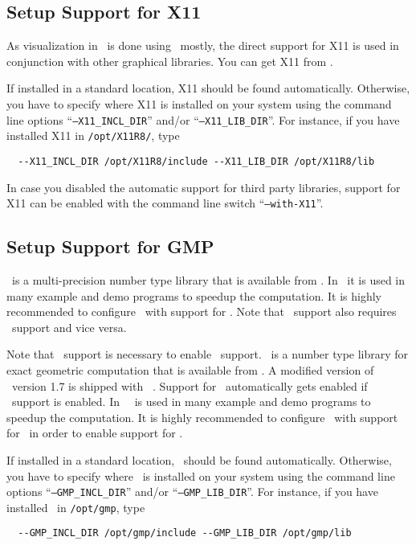 \subsection{Setup Support for X11\label{sec:x11-setup}}

As visualization in \cgal\ is done using \qt\ mostly, the direct
support for X11 is used in conjunction with other graphical libraries.
You can get X11 from \xpage.

If installed in a standard location, X11 should be found
automatically. Otherwise, you have to specify where X11 is installed
on your system using the command line options
``\texttt{--X11\_INCL\_DIR}'' and/or ``\texttt{--X11\_LIB\_DIR}''. For
instance, if you have installed X11 in \texttt{/opt/X11R8/}, type
\begin{verbatim}
  --X11_INCL_DIR /opt/X11R8/include --X11_LIB_DIR /opt/X11R8/lib
\end{verbatim}

In case you disabled the automatic support for third party libraries,
support for X11 can be enabled with the command line switch
``\texttt{--with-X11}''.

\subsection{Setup Support for GMP\label{sec:gmp-setup}}

\gmp\ is a multi-precision number type library that is available from
\gmppage. In \cgal\ it is used in many example and demo programs to
speedup the computation. It is highly recommended to configure \cgal\
with support for \gmp. Note that \gmp\ support also requires \mpfr\
support and vice versa.

Note that \gmp\ support is necessary to enable \core\ support.
\core\ is a number type library for exact geometric computation that
is available from \corepage. A modified version of \core\ version 1.7
is shipped with \cgal~\cgalrelease. Support for \core\ automatically
gets enabled if \gmp\ support is enabled. In \cgal\, \core\ is used
in many example and demo programs to speedup the computation. It is
highly recommended to configure \cgal\ with support for \gmp\ in order
to enable support for \core.

If installed in a standard location, \gmp\ should be
found automatically. Otherwise, you have to specify where \gmp\ is
installed on your system using the command line options
``\texttt{--GMP\_INCL\_DIR}'' and/or ``\texttt{--GMP\_LIB\_DIR}''. For
instance, if you have installed \gmp\ in \texttt{/opt/gmp}, type
\begin{verbatim}
  --GMP_INCL_DIR /opt/gmp/include --GMP_LIB_DIR /opt/gmp/lib
\end{verbatim}

